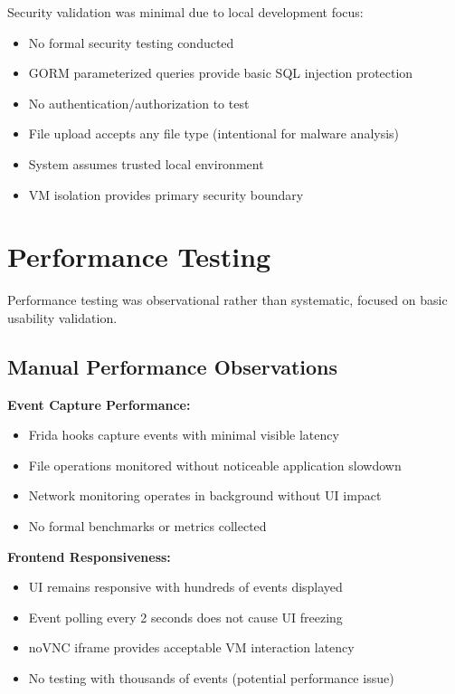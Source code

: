 \begin{itemize}
Security validation was minimal due to local development focus:

\begin{itemize}
    \item No formal security testing conducted
    \item GORM parameterized queries provide basic SQL injection protection
    \item No authentication/authorization to test
    \item File upload accepts any file type (intentional for malware analysis)
    \item System assumes trusted local environment
    \item VM isolation provides primary security boundary
\end{itemize}

\section{Performance Testing}

Performance testing was observational rather than systematic, focused on basic usability validation.

\subsection{Manual Performance Observations}

\textbf{Event Capture Performance:}
\begin{itemize}
    \item Frida hooks capture events with minimal visible latency
    \item File operations monitored without noticeable application slowdown
    \item Network monitoring operates in background without UI impact
    \item No formal benchmarks or metrics collected
\end{itemize}

\textbf{Frontend Responsiveness:}
\begin{itemize}
    \item UI remains responsive with hundreds of events displayed
    \item Event polling every 2 seconds does not cause UI freezing
    \item noVNC iframe provides acceptable VM interaction latency
    \item No testing with thousands of events (potential performance issue)
\end{itemize}


\end{itemize}
